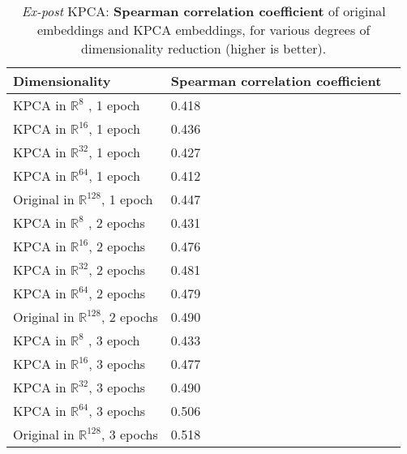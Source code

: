 
\begin{table}[h]

\centering

\begin{tabular}{|l|l|l|}
\hline
\rowcolor[HTML]{C0C0C0} 
\textbf{Dimensionality} & \textbf{Spearman correlation coefficient} \\ \hline
KPCA in $\mathbb{R}^8$ , 1 epoch & 0.418 \\ \hline
KPCA in $\mathbb{R}^{16}$, 1 epoch & 0.436 \\ \hline
KPCA in $\mathbb{R}^{32}$, 1 epoch & 0.427 \\ \hline
KPCA in $\mathbb{R}^{64}$, 1 epoch & 0.412 \\ \hline
Original in $\mathbb{R}^{128}$, 1 epoch & 0.447 \\ \hline
KPCA in $\mathbb{R}^8$ , 2 epochs & 0.431 \\ \hline
KPCA in $\mathbb{R}^{16}$, 2 epochs & 0.476 \\ \hline
KPCA in $\mathbb{R}^{32}$, 2 epochs & 0.481 \\ \hline
KPCA in $\mathbb{R}^{64}$, 2 epochs & 0.479 \\ \hline
Original in $\mathbb{R}^{128}$, 2 epochs & 0.490 \\ \hline
KPCA in $\mathbb{R}^8$ , 3 epoch & 0.433\\ \hline
KPCA in $\mathbb{R}^{16}$, 3 epochs & 0.477 \\ \hline
KPCA in $\mathbb{R}^{32}$, 3 epochs & 0.490\\ \hline
KPCA in $\mathbb{R}^{64}$, 3 epochs & 0.506\\ \hline
Original in $\mathbb{R}^{128}$, 3 epochs & 0.518 \\ \hline
\end{tabular}
\caption{\textit{Ex-post} KPCA: \textbf{Spearman correlation coefficient} of original embeddings and KPCA embeddings, for various degrees of dimensionality reduction (higher is better). }
\label{table:quant-1k-post}
\end{table}

